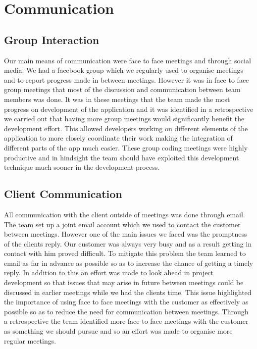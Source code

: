 \documentclass{l3proj}
\begin{document}
\section{Communication}
\label{sec:communication}

\subsection{Group Interaction}
Our main means of communication were face to face meetings and through social media. We had a facebook group which we regularly used to organise meetings and to report progress made in between meetings. However it was in face to face group meetings that most of the discussion and communication between team members was done. It was in these meetings that the team made the most progress on development of the application and it was identified in a retrospective we carried out that having more group meetings would significantly benefit the development effort. This allowed developers working on different elements of the application to more closely coordinate their work making the integration of different parts of the app much easier. These group coding meetings were highly productive and in hindsight the team should have exploited this development technique much sooner in the development process.

\subsection{Client Communication}
All communication with the client outside of meetings was done through email. The team set up a joint email account which we used to contact the customer between meetings. However one of the main issues we faced was the promptness of the clients reply. Our customer was always very busy and as a result getting in contact with him proved difficult. To mitigate this problem the team learned to email as far in advance as possible so as to increase the chance of getting a timely reply. In addition to this an effort was made to look ahead in project development so that issues that may arise in future between meetings could be discussed in earlier meetings while we had the clients time. This issue highlighted the importance of using face to face meetings with the customer as effectively as possible so as to reduce the need for communication between meetings. Through a retrospective the team identified more face to face meetings with the customer as something we should pursue and so an effort was made to organise more regular meetings.
\end{document}
